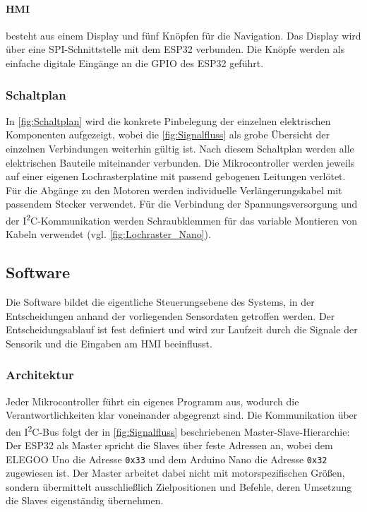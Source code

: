 \paragraph{HMI} besteht aus einem Display und fünf Knöpfen für die Navigation. Das Display wird über eine SPI-Schnittstelle
mit dem ESP32 verbunden. Die Knöpfe werden als einfache digitale Eingänge an die GPIO des ESP32 geführt.

\subsubsection{Schaltplan}\label{sec:Schaltplan}
In \cref{fig:Schaltplan} wird die konkrete Pinbelegung der einzelnen elektrischen Komponenten aufgezeigt, wobei die \cref{fig:Signalfluss} als
grobe Übersicht der einzelnen Verbindungen weiterhin gültig ist. Nach diesem Schaltplan werden alle elektrischen Bauteile
miteinander verbunden. Die Mikrocontroller werden jeweils auf einer eigenen Lochrasterplatine mit passend gebogenen
Leitungen verlötet. Für die Abgänge zu den Motoren werden individuelle Verlängerungskabel mit passendem Stecker verwendet. Für
die Verbindung der Spannungsversorgung und der I\textsuperscript{2}C-Kommunikation werden Schraubklemmen für das variable Montieren von Kabeln verwendet (vgl. \cref{fig:Lochraster_Nano}).

\subsection{Software}\label{sec:Software}
Die Software bildet die eigentliche Steuerungsebene des Systems, in der Entscheidungen
anhand der vorliegenden Sensordaten getroffen werden. Der Entscheidungsablauf ist fest
definiert und wird zur Laufzeit durch die Signale der Sensorik und die Eingaben am
HMI beeinflusst.

\subsubsection{Architektur}\label{sec:CodeStruktur}
Jeder Mikrocontroller führt ein eigenes Programm aus, wodurch die Verantwortlichkeiten
klar voneinander abgegrenzt sind. Die Kommunikation über den I\textsuperscript{2}C-Bus
folgt der in \cref{fig:Signalfluss} beschriebenen Master-Slave-Hierarchie: Der
ESP32 als Master spricht die Slaves über feste Adressen an, wobei dem ELEGOO Uno die
Adresse \texttt{0x33} und dem Arduino Nano die Adresse \texttt{0x32} zugewiesen ist.
Der Master arbeitet dabei nicht mit motorspezifischen Größen, sondern übermittelt
ausschließlich Zielpositionen und Befehle, deren Umsetzung die Slaves eigenständig
übernehmen.

